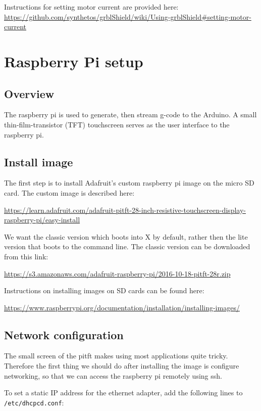 \documentclass[]{book}
\theoremstyle{definition}
\theoremstyle{definition}
\theoremstyle{definition}
\theoremstyle{remark}
\begin{document}
Instructions for setting motor current are provided here:
\url{https://github.com/synthetos/grblShield/wiki/Using-grblShield\#setting-motor-current}

\chapter{Raspberry Pi setup}\label{raspi}

\section{Overview}\label{overview-1}

The raspberry pi is used to generate, then stream g-code to the Arduino.
A small thin-film-transistor (TFT) touchscreen serves as the user
interface to the raspberry pi.

\section{Install image}\label{install-image}

The first step is to install Adafruit's custom raspberry pi image on the
micro SD card. The custom image is described here:

\url{https://learn.adafruit.com/adafruit-pitft-28-inch-resistive-touchscreen-display-raspberry-pi/easy-install}

We want the classic version which boots into X by default, rather then
the lite version that boots to the command line. The classic version can
be downloaded from this link:

\url{https://s3.amazonaws.com/adafruit-raspberry-pi/2016-10-18-pitft-28r.zip}

Instructions on installing images on SD cards can be found here:

\url{https://www.raspberrypi.org/documentation/installation/installing-images/}

\section{Network configuration}\label{network-configuration}

The small screen of the pitft makes using most applications quite
tricky. Therefore the first thing we should do after installing the
image is configure networking, so that we can access the raspberry pi
remotely using ssh.

To set a static IP address for the ethernet adapter, add the following
lines to \texttt{/etc/dhcpcd.conf}:
\end{document}
